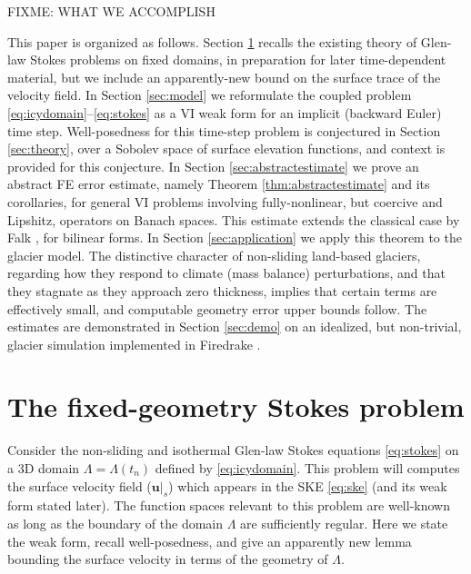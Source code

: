 \documentclass[hidelinks,onefignum,onetabnum,final]{siamart220329}  %
\newcommand{\bu}{\mathbf{u}}
\begin{document}
FIXME: WHAT WE ACCOMPLISH

This paper is organized as follows.  Section \ref{sec:stokes} recalls the existing theory of Glen-law Stokes problems on fixed domains, in preparation for later time-dependent material, but we include an apparently-new bound on the surface trace of the velocity field.  In Section \ref{sec:model} we reformulate the coupled problem \eqref{eq:icydomain}--\eqref{eq:stokes} as a VI weak form for an implicit (backward Euler) time step.  Well-posedness for this time-step problem is conjectured in Section \ref{sec:theory}, over a Sobolev space of surface elevation functions, and context is provided for this conjecture.  In Section \ref{sec:abstractestimate} we prove an abstract FE error estimate, namely Theorem \ref{thm:abstractestimate} and its corollaries, for general VI problems involving fully-nonlinear, but coercive and Lipshitz, operators on Banach spaces.  This estimate extends the classical case by Falk \cite{Falk1974}, for bilinear forms.  In Section \ref{sec:application} we apply this theorem to the glacier model.  The distinctive character of non-sliding land-based glaciers, regarding how they respond to climate (mass balance) perturbations, and that they stagnate as they approach zero thickness, implies that certain terms are effectively small, and computable geometry error upper bounds follow.  The estimates are demonstrated in Section \ref{sec:demo} on an idealized, but non-trivial, glacier simulation implemented in Firedrake \cite{Hametal2023}.


\section{The fixed-geometry Stokes problem} \label{sec:stokes}

Consider the non-sliding and isothermal Glen-law Stokes equations \eqref{eq:stokes} on a 3D domain $\Lambda = \Lambda(t_n)$ defined by \eqref{eq:icydomain}.  This problem will computes the surface velocity field ($\bu|_s$) which appears in the SKE \eqref{eq:ske} (and its weak form stated later).  The function spaces relevant to this problem are well-known as long as the boundary of the domain $\Lambda$ are sufficiently regular.  Here we state the weak form, recall well-posedness, and give an apparently new lemma bounding the surface velocity in terms of the geometry of $\Lambda$.
\end{document}
